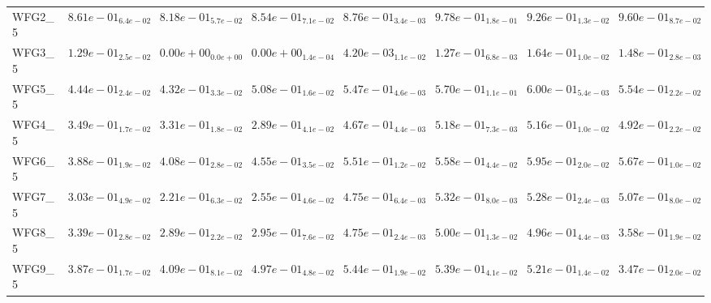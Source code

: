 \documentclass{article}
\begin{document}
\begin{table}
\begin{scriptsize}
\begin{tabular}{llllllll}
WFG2\_5 & $  8.61e-01_{ 6.4e-02}$ & $  8.18e-01_{ 5.7e-02}$ & $  8.54e-01_{ 7.1e-02}$ & $  8.76e-01_{ 3.4e-03}$ & \cellcolor{gray95}$  9.78e-01_{ 1.8e-01}$ & $  9.26e-01_{ 1.3e-02}$ & \cellcolor{gray25}$  9.60e-01_{ 8.7e-02}$ \\
WFG3\_5 & $  1.29e-01_{ 2.5e-02}$ & $  0.00e+00_{ 0.0e+00}$ & $  0.00e+00_{ 1.4e-04}$ & $  4.20e-03_{ 1.1e-02}$ & $  1.27e-01_{ 6.8e-03}$ & \cellcolor{gray95}$  1.64e-01_{ 1.0e-02}$ & \cellcolor{gray25}$  1.48e-01_{ 2.8e-03}$ \\
WFG5\_5 & $  4.44e-01_{ 2.4e-02}$ & $  4.32e-01_{ 3.3e-02}$ & $  5.08e-01_{ 1.6e-02}$ & $  5.47e-01_{ 4.6e-03}$ & \cellcolor{gray25}$  5.70e-01_{ 1.1e-01}$ & \cellcolor{gray95}$  6.00e-01_{ 5.4e-03}$ & $  5.54e-01_{ 2.2e-02}$ \\
WFG4\_5 & $  3.49e-01_{ 1.7e-02}$ & $  3.31e-01_{ 1.8e-02}$ & $  2.89e-01_{ 4.1e-02}$ & $  4.67e-01_{ 4.4e-03}$ & \cellcolor{gray95}$  5.18e-01_{ 7.3e-03}$ & \cellcolor{gray25}$  5.16e-01_{ 1.0e-02}$ & $  4.92e-01_{ 2.2e-02}$ \\
WFG6\_5 & $  3.88e-01_{ 1.9e-02}$ & $  4.08e-01_{ 2.8e-02}$ & $  4.55e-01_{ 3.5e-02}$ & $  5.51e-01_{ 1.2e-02}$ & $  5.58e-01_{ 4.4e-02}$ & \cellcolor{gray95}$  5.95e-01_{ 2.0e-02}$ & \cellcolor{gray25}$  5.67e-01_{ 1.0e-02}$ \\
WFG7\_5 & $  3.03e-01_{ 4.9e-02}$ & $  2.21e-01_{ 6.3e-02}$ & $  2.55e-01_{ 4.6e-02}$ & $  4.75e-01_{ 6.4e-03}$ & \cellcolor{gray95}$  5.32e-01_{ 8.0e-03}$ & \cellcolor{gray25}$  5.28e-01_{ 2.4e-03}$ & $  5.07e-01_{ 8.0e-02}$ \\
WFG8\_5 & $  3.39e-01_{ 2.8e-02}$ & $  2.89e-01_{ 2.2e-02}$ & $  2.95e-01_{ 7.6e-02}$ & $  4.75e-01_{ 2.4e-03}$ & \cellcolor{gray95}$  5.00e-01_{ 1.3e-02}$ & \cellcolor{gray25}$  4.96e-01_{ 4.4e-03}$ & $  3.58e-01_{ 1.9e-02}$ \\
WFG9\_5 & $  3.87e-01_{ 1.7e-02}$ & $  4.09e-01_{ 8.1e-02}$ & $  4.97e-01_{ 4.8e-02}$ & \cellcolor{gray95}$  5.44e-01_{ 1.9e-02}$ & \cellcolor{gray25}$  5.39e-01_{ 4.1e-02}$ & $  5.21e-01_{ 1.4e-02}$ & $  3.47e-01_{ 2.0e-02}$ \\
\hline
\end{tabular}
\end{scriptsize}
\end{table}
\end{document}
